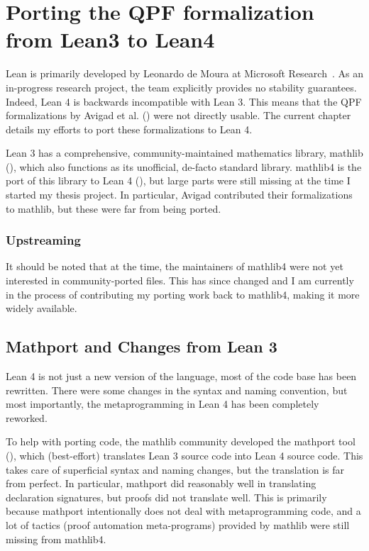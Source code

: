 
\chapter{Porting the QPF formalization from Lean3 to Lean4}%
\label{ch:porting}

Lean is primarily developed by Leonardo de Moura \etal{} at Microsoft Research~\cite{demouraLeanTheoremProver2015, avigadTheoremProvingLean}. As an in-progress research project, the team explicitly provides no stability guarantees. Indeed, Lean 4 is backwards incompatible with Lean 3.
This means that the QPF formalizations by Avigad et al. \etal{}
(\cite{avigadDataTypesQuotients2019a}) were not directly usable. The current chapter details my efforts to port these formalizations to Lean 4.



Lean 3 has a comprehensive, community-maintained mathematics library, mathlib (\cite{themathlibcommunityLeanMathematicalLibrary2020}), 
which also functions as its unofficial, de-facto standard library.
mathlib4 is the port of this library to Lean 4 (\cite{mathlib4}),
but large parts were still missing at the time I started my thesis project.
In particular, Avigad \etal{} contributed their formalizations to mathlib, but these were far from
being ported.



\subsection*{Upstreaming}
It should be noted that at the time, the maintainers of mathlib4 were not yet interested in 
community-ported files. This has since changed and I am currently in the process of
contributing my porting work back to mathlib4, making it more widely available.




\section{Mathport and Changes from Lean 3}
Lean 4 is not just a new version of the language, most of the code base has been rewritten.
There were some changes in the syntax and naming convention, but most importantly, 
the metaprogramming in Lean 4 has been completely reworked.

To help with porting code, the mathlib community developed the mathport tool (\cite{mathport}), which 
(best-effort) translates Lean 3 source code into Lean 4 source code. This takes care of superficial 
syntax and naming changes, but the translation is far from perfect.
In particular, mathport did reasonably well in translating declaration signatures, 
but proofs did not translate well.
This is primarily because mathport intentionally does not deal with metaprogramming code, and a lot
of tactics (proof automation meta-programs) provided by mathlib were still missing from mathlib4.


